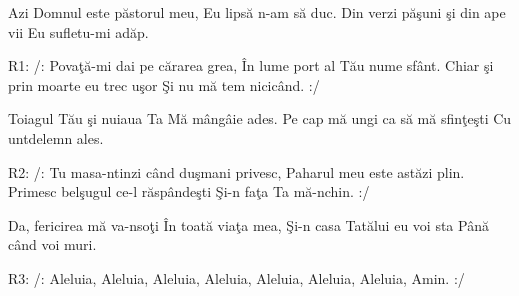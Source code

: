 
\beginverse
Azi Domnul este păstorul meu,
Eu lipsă n-am să duc.
Din verzi păşuni şi din ape vii
Eu sufletu-mi adăp.
\endverse

\beginchorus
R1: /: Povaţă-mi dai pe cărarea grea,
În lume port al Tău nume sfânt.
Chiar şi prin moarte eu trec uşor
Şi nu mă tem nicicând. :/
\endchorus

\beginverse
Toiagul Tău şi nuiaua Ta
Mă mângâie ades.
Pe cap mă ungi ca să mă sfinţeşti
Cu untdelemn ales.
\endverse

\beginchorus
R2: /: Tu masa-ntinzi când duşmani privesc,
Paharul meu este astăzi plin.
Primesc belşugul ce-l răspândeşti
Şi-n faţa Ta mă-nchin. :/
\endchorus

\beginverse
Da, fericirea mă va-nsoţi
În toată viaţa mea,
Şi-n casa Tatălui eu voi sta
Până când voi muri.
\endverse

\beginchorus
R3: /: Aleluia, Aleluia,
Aleluia, Aleluia,
Aleluia, Aleluia,
Aleluia, Amin. :/
\endchorus

\endsong